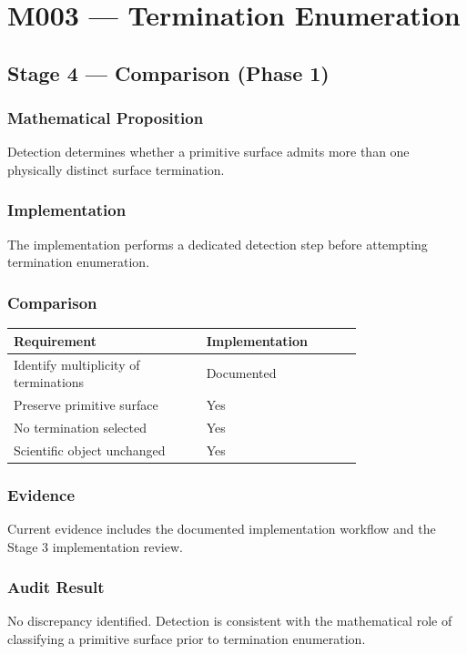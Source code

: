 \chapter{M003 --- Termination Enumeration}

\section{Stage 4 --- Comparison (Phase 1)}

\subsection{Mathematical Proposition}

Detection determines whether a primitive surface admits more than one
physically distinct surface termination.

\subsection{Implementation}

The implementation performs a dedicated detection step before attempting
termination enumeration.

\subsection{Comparison}

\begin{tabular}{|p{0.42\linewidth}|p{0.34\linewidth}|}
\hline
Requirement & Implementation\\
\hline
Identify multiplicity of terminations & Documented\\
Preserve primitive surface & Yes\\
No termination selected & Yes\\
Scientific object unchanged & Yes\\
\hline
\end{tabular}

\subsection{Evidence}

Current evidence includes the documented implementation workflow and the
Stage 3 implementation review.

\subsection{Audit Result}

No discrepancy identified. Detection is consistent with the mathematical
role of classifying a primitive surface prior to termination
enumeration.
